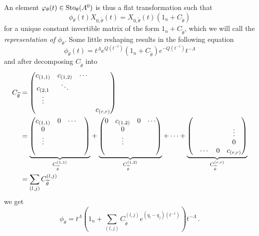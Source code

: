 An element $\varphi_\theta(t)\in\operatorname{Sto}_\theta(A^0)$ is thus a flat transformation
such that
\[
  \phi_\theta(t)X_{0,\tilde\theta}(t)
  =X_{0,\tilde\theta}(t)(1_n+C_{\tilde\theta})
\]
for a unique constant invertible matrix of the form $1_n+C_{\tilde\theta}$,
which we will call the \emph{representation of $\phi_\theta$}.
Some little reshaping results in the following equation
\[
  \phi_\theta(t)
  =t^\Lambda e^{Q(t^{-1})}(1_n+C_{\tilde\theta})e^{-Q(t^{-1})}t^{-\Lambda}
\]
and after decomposing  $C_{\tilde\theta}$
into 
\begin{align*}
  C_{\tilde\theta}&=\begin{pmatrix}
    c_{(1,1)} & c_{(1,2)} & \cdots &\\
    c_{(2,1} & \ddots\\
    \vdots \\
    & & & c_{(r,r)}
  \end{pmatrix}
\\&=
  \underset{C_{\tilde\theta}^{(1,1)}}{\underbrace{%
    \begin{pmatrix}
      c_{(1,1)} & 0 & \cdots &\\
      0\\
      \vdots&\\
      &
    \end{pmatrix}
  }}
  +
  \underset{C_{\tilde\theta}^{(1,2)}}{\underbrace{%
    \begin{pmatrix}
      0 & c_{(1,2)} & 0 & \cdots\\
      & 0 &\\
      &\vdots\\
      &
    \end{pmatrix}
  }}
  +\cdots+
  \underset{C_{\tilde\theta}^{(r,r)}}{\underbrace{%
    \begin{pmatrix}
      &\\
      & & & \vdots\\
      & & & 0\\
      & \cdots & 0 & c_{(r,r)}
    \end{pmatrix}
  }}
\\&=\sum_{(l,j)}C_{\tilde\theta}^{(l,j)}
\end{align*}
we get
\[
  \phi_\theta=
    t^\Lambda\left(
      1_n+\sum_{(l,j)}C_{\tilde\theta}^{(l,j)}e^{(q_l-q_j)(t^{-1})}
    \right)t^{-\Lambda} \,.
\]

